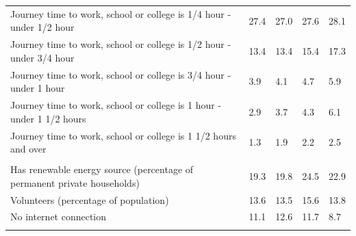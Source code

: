 \documentclass{article}
\begin{document}
\begin{table}[h]
\begin{tabular}{KTTTT}
Journey time to work, school or college is 1/4 hour - under 1/2 hour & 27.4& 27.0& 27.6& 28.1\\
Journey time to work, school or college is 1/2 hour - under 3/4 hour & 13.4& 13.4& 15.4& 17.3\\
Journey time to work, school or college is 3/4 hour - under 1 hour & 3.9& 4.1& 4.7& 5.9\\
Journey time to work, school or college is 1 hour - under 1 1/2 hours & 2.9& 3.7& 4.3& 6.1\\
Journey time to work, school or college is 1 1/2 hours and over & 1.3& 1.9& 2.2& 2.5\\
\hline
    \\ 
    \hline
Has renewable energy source (percentage of permanent private households) & 19.3& 19.8& 24.5& 22.9\\
    \hline
Volunteers (percentage of population) & 13.6& 13.5& 15.6& 13.8\\
    \hline
No internet connection& 11.1& 12.6& 11.7&  8.7\\
\hline
\end{tabular}
\end{table}
\end{document}
